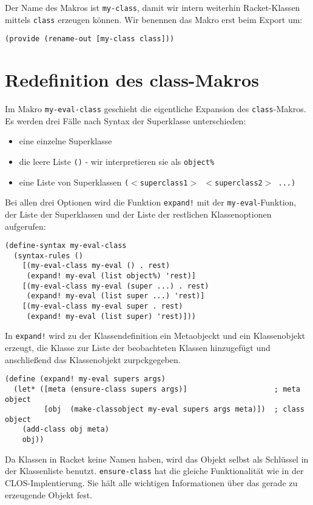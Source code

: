 Der Name des Makros ist \texttt{my-class}, damit wir intern weiterhin Racket-Klassen mittels \texttt{class} erzeugen können. Wir benennen das Makro erst beim Export um:

\begin{lstlisting}
(provide (rename-out [my-class class]))
\end{lstlisting}

\section{Redefinition des class-Makros}
Im Makro \texttt{my-eval-class} geschieht die eigentliche Expansion des \texttt{class}-Makros. Es werden drei Fälle nach Syntax der Superklasse unterschieden:
\begin{itemize}
 \item eine einzelne Superklasse 
 \item die leere Liste \texttt{()} - wir interpretieren sie als \texttt{object\%}
 \item eine Liste von Superklassen \texttt{($<$superclass1$>$ $<$superclass2$>$ ...)}
\end{itemize}

Bei allen drei Optionen wird die Funktion \texttt{expand!} mit der \texttt{my-eval}-Funktion, der Liste der Superklassen und der Liste der restlichen Klassenoptionen aufgerufen:

\begin{lstlisting}
(define-syntax my-eval-class
  (syntax-rules ()
    [(my-eval-class my-eval () . rest) 
     (expand! my-eval (list object%) 'rest)]
    [(my-eval-class my-eval (super ...) . rest)
     (expand! my-eval (list super ...) 'rest)]
    [(my-eval-class my-eval super . rest)
     (expand! my-eval (list super) 'rest)]))
\end{lstlisting}

In \texttt{expand!} wird zu der Klassendefinition ein Metaobjeckt und ein Klassenobjekt erzeugt, die Klasse zur Liste der beobachteten Klassen hinzugefügt und anschließend das Klassenobjekt zurpckgegeben.

\begin{lstlisting}
(define (expand! my-eval supers args)
  (let* ([meta (ensure-class supers args)]                    ; meta object
         [obj  (make-classobject my-eval supers args meta)])  ; class object
    (add-class obj meta)
    obj))
\end{lstlisting}

Da Klassen in Racket keine Namen haben, wird das Objekt selbst als Schlüssel in der Klassenliste benutzt. \texttt{ensure-class} hat die gleiche Funktionalität wie in der CLOS-Implentierung. Sie hält alle wichtigen Informationen über das gerade zu erzeugende Objekt fest. 


